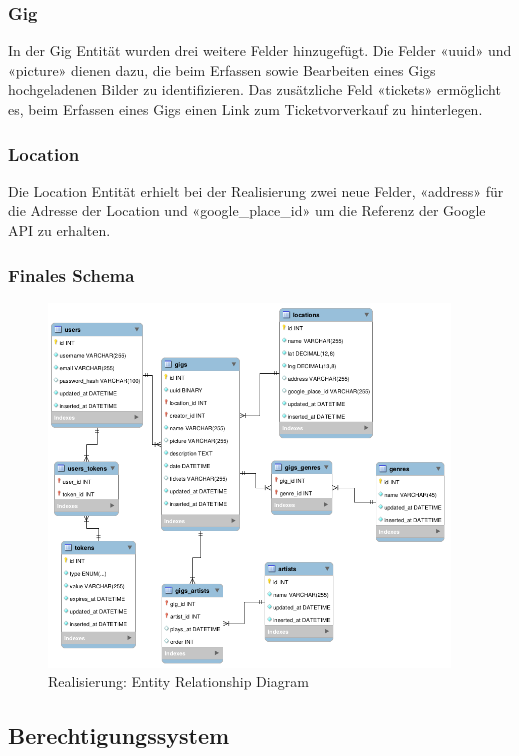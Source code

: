 \subsubsection{Gig}
In der Gig Entität wurden drei weitere Felder hinzugefügt.
Die Felder «uuid» und «picture» dienen dazu, die beim Erfassen sowie
Bearbeiten eines Gigs hochgeladenen Bilder zu identifizieren.
Das zusätzliche Feld «tickets» ermöglicht es, beim Erfassen eines Gigs
einen Link zum Ticketvorverkauf zu hinterlegen.

\subsubsection{Location}
Die Location Entität erhielt bei der Realisierung zwei neue Felder,
«address» für die Adresse der Location und
«google\_place\_id» um die Referenz der Google API zu erhalten.

\clearpage
\subsubsection{Finales Schema}

\begin{figure}[!htb]
  \centering
  \includegraphics[width=0.95\textwidth]{realisierung/erd.png}
  \caption{Realisierung: Entity Relationship Diagram}
\end{figure}

\clearpage
\subsection{Berechtigungssystem}

